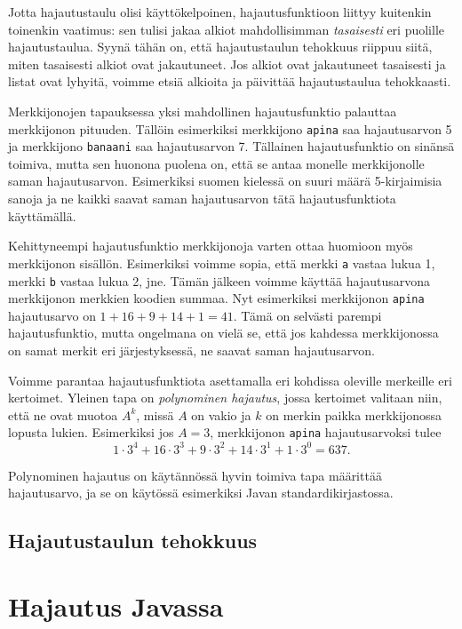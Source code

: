 Jotta hajautustaulu olisi käyttökelpoinen, hajautusfunktioon
liittyy kuitenkin toinenkin vaatimus:
sen tulisi jakaa alkiot mahdollisimman \emph{tasaisesti}
eri puolille hajautustaulua.
Syynä tähän on, että hajautustaulun tehokkuus riippuu siitä,
miten tasaisesti alkiot ovat jakautuneet.
Jos alkiot ovat jakautuneet tasaisesti ja listat ovat lyhyitä,
voimme etsiä alkioita ja päivittää hajautustaulua tehokkaasti.

Merkkijonojen tapauksessa yksi mahdollinen hajautusfunktio
palauttaa merkkijonon pituuden.
Tällöin esimerkiksi merkkijono \texttt{apina} saa
hajautusarvon 5 ja merkkijono \texttt{banaani} saa
hajautusarvon 7.
Tällainen hajautusfunktio on sinänsä toimiva,
mutta sen huonona puolena on, että se antaa monelle
merkkijonolle saman hajautusarvon.
Esimerkiksi suomen kielessä on suuri määrä 5-kirjaimisia
sanoja ja ne kaikki saavat saman hajautusarvon tätä
hajautusfunktiota käyttämällä.

Kehittyneempi hajautusfunktio merkkijonoja varten
ottaa huomioon myös merkkijonon sisällön.
Esimerkiksi voimme sopia, että merkki \texttt{a} vastaa
lukua 1, merkki \texttt{b} vastaa lukua 2, jne.
Tämän jälkeen voimme käyttää hajautusarvona merkkijonon
merkkien koodien summaa.
Nyt esimerkiksi merkkijonon \texttt{apina} hajautusarvo
on $1+16+9+14+1=41$.
Tämä on selvästi parempi hajautusfunktio,
mutta ongelmana on vielä se, että jos kahdessa
merkkijonossa on samat merkit eri järjestyksessä,
ne saavat saman hajautusarvon.

Voimme parantaa hajautusfunktiota asettamalla eri
kohdissa oleville merkeille eri kertoimet.
Yleinen tapa on \emph{polynominen hajautus},
jossa kertoimet valitaan niin, että ne ovat muotoa
$A^k$, missä $A$ on vakio ja $k$ on merkin paikka
merkkijonossa lopusta lukien.
Esimerkiksi jos $A=3$, merkkijonon \texttt{apina}
hajautusarvoksi tulee
\[ 1\cdot3^4+16\cdot3^3+9\cdot3^2+14\cdot3^1+1\cdot3^0 = 637.\]

Polynominen hajautus on käytännössä hyvin toimiva tapa
määrittää hajautusarvo, ja se on käytössä esimerkiksi
Javan standardikirjastossa.

\subsection{Hajautustaulun tehokkuus}

\section{Hajautus Javassa}

